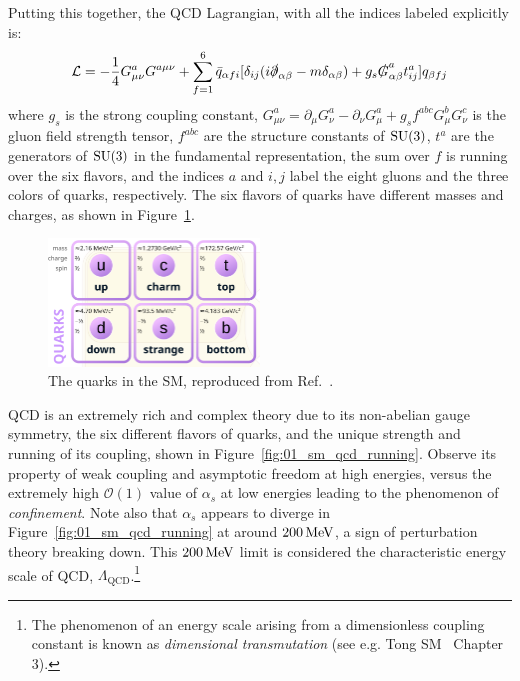 Putting this together, the QCD Lagrangian, with all the indices labeled explicitly is:
\begin{equation}
	\label{eq:01_sm_qcd_lagrangian}
	\mathcal L = -\frac{1}{4} G^a_{\mu\nu} G^{a\mu\nu} + \sum_{f = 1}^6 \bar q_{\alpha f i} [\delta_{ij}(i\cslashed {\partial}_{\alpha\beta} - m \delta_{\alpha\beta}) + g_s \cslashed G^a_{\alpha\beta} t_{ij}^a] q_{\beta f j}
\end{equation}
where $g_s$ is the strong coupling constant, $G^a_{\mu\nu} = \partial_\mu G^a_\nu - \partial_\nu G^a_\mu + g_s f^{abc} G^b_\mu G^c_\nu$ is the gluon field strength tensor, $f^{abc}$ are the structure constants of $\SU[3]$, $t^a$ are the generators of $\SU[3]$ in the fundamental representation, the sum over $f$ is running over the six flavors, and the indices $a$ and $i, j$ label the eight gluons and the three colors of quarks, respectively.
The six flavors of quarks have different masses and charges, as shown in Figure~\ref{fig:01_sm_qcd_quarks}.

\begin{figure}[ht]
	\centering
	\captionsetup{justification=centering}
	\includegraphics[width=0.5\textwidth]{figures/01-SM-03-SM/qcd/quarks.png}
	\caption{The quarks in the SM, reproduced from Ref.~\cite{enwiki:1238968997}.}
	\label{fig:01_sm_qcd_quarks}
\end{figure}

QCD is an extremely rich and complex theory due to its non-abelian gauge symmetry, the six different flavors of quarks, and the unique strength and running of its coupling, shown in Figure~\ref{fig:01_sm_qcd_running}.
Observe its property of weak coupling and asymptotic freedom at high energies, versus the extremely high $\mathcal O(1)$ value of $\alpha_s$ at low energies leading to the phenomenon of \textit{confinement}.
Note also that $\alpha_s$ appears to diverge in Figure~\ref{fig:01_sm_qcd_running} at around $200 \,\text{Me\hspace{-.08em}V}$, a sign of perturbation theory breaking down. 
This $200 \,\text{Me\hspace{-.08em}V}$ limit is considered the characteristic energy scale of QCD, $\Lambda_{\mathrm{QCD}}$.\footnote{The phenomenon of an energy scale arising from a dimensionless coupling constant  is known as \textit{dimensional transmutation} (see e.g. Tong SM~\cite{TongSM} Chapter 3).}

